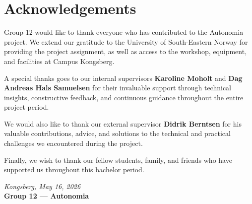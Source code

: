 \clearpage
\thispagestyle{empty}
{}
\section*{Acknowledgements}

\vspace{0.5cm}

Group 12 would like to thank everyone who has contributed to the Autonomia project. 
We extend our gratitude to the University of South-Eastern Norway for providing the 
project assignment, as well as access to the workshop, equipment, and facilities at 
Campus Kongsberg.

\vspace{0.4cm}

A special thanks goes to our internal supervisors \textbf{Karoline Moholt} and 
\textbf{Dag Andreas Hals Samuelsen} for their invaluable support through technical 
insights, constructive feedback, and continuous guidance throughout the entire 
project period.

\vspace{0.4cm}

We would also like to thank our external supervisor \textbf{Didrik Berntsen} for 
his valuable contributions, advice, and solutions to the technical and practical 
challenges we encountered during the project.

\vspace{0.4cm}

Finally, we wish to thank our fellow students, family, and friends who have 
supported us throughout this bachelor period.

\vspace{1.5cm}

\noindent\textit{Kongsberg, May 16, 2026}\\[0.3cm]
\noindent\textbf{Group 12 --- Autonomia}

\clearpage
